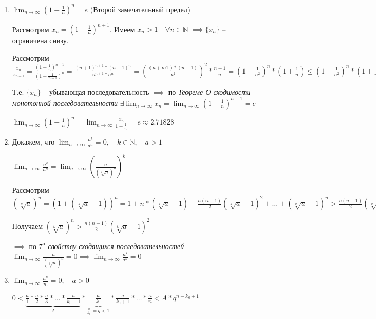 \documentclass[a4paper,oneside]{article}
\newcommand{\dslim}{\displaystyle\lim}
\newcommand{\dslimn}{\dslim_{n \to \infty}}
\begin{document}
\begin{enumerate}
    \item $\displaystyle \lim_{n \to \infty} \left( 1 + \frac{1}{n} \right)^n = e$ (Второй замечательный предел)
    
    Рассмотрим $x_n = \left( 1 + \frac{1}{n} \right)^{n + 1}$. 
    Имеем $x_n > 1 \quad \forall n \in \mathbb{N}$ $\implies \{x_n\}$ -- ограничена снизу.

    Рассмотрим $\frac{x_n}{x_{n-1}} = 
    \frac{\left( 1 + \frac{1}{n} \right)^{n - 1}}{\left( 1 + \frac{1}{n - 1} \right)^{n}}
    = \frac{(n + 1)^{n+1} * (n - 1)^n}{n^{n+1} * n^n}
    = \left( \frac{(n + m1) * (n - 1)}{n^2} \right)^2 * \frac{n + 1}{n}
    = \left( 1 - \frac{1}{n^2} \right)^{n} * \left( 1 + \frac{1}{n} \right)
    \le \left( 1 - \frac{1}{n^2} \right)^{n} * \left( 1 + \frac{1}{n^2} \right)^n
    \le \left( 1 - \frac{1}{n^4} \right)^{n} < 1 \implies x_n < x_{n-1}$

    Т.е. $\{x_n\}$ -- убывающая последовательность $\implies$
    по \textit{Теореме О сходимости монотонной последовательности}
    $\exists \dslimn x_n = 
    \dslimn \left( 1 + \frac{1}{n} \right)^{n + 1} = e$

    $\dslimn \left( 1 - \frac{1}{n} \right)^{n}
    = \dslimn \frac{x_n}{1 + \frac{1}{n}} = e \approx 2.71828$


    \item Докажем, что $\dslimn \frac{n^k}{a^n} = 0,
    \quad k \in \mathbb{N}, \quad a > 1$

    $\dslimn \frac{n^k}{a^n} = 
    \dslimn \left( \frac{n}{(\sqrt[k]{a})^n} \right)^k$

    Рассмотрим $(\sqrt[k]{a})^n = (1 + (\sqrt[k]{a} - 1)) ^ n = 
    1 + n * (\sqrt[k]{a} - 1) + \frac{n (n - 1)}{2} (\sqrt[k]{a} - 1)^2
    + \dots + (\sqrt[k]{a} - 1)^n > \frac{n (n - 1)}{2} (\sqrt[k]{a} - 1)^2$

    Получаем $(\sqrt[k]{a})^n > \frac{n (n - 1)}{2} (\sqrt[k]{a} - 1)^2$

    $\implies$ по \textit{$7^{\text{о}}$ свойству сходящихся последовательностей}
    $\dslimn \frac{n}{(\sqrt[k]{a})^n} = 0
    \implies \dslimn \frac{n^k}{a^n} = 0$


    \item $\dslimn \frac{a^n}{n!} = 0, \quad a > 0$

    $0 < \underbrace{\frac{a}{1} * \frac{a}{2} * \frac{a}{3} * \dots * \frac{a}{k_0 - 1}}_A
    * \underbrace{\frac{a}{k_0}}_{\frac{a}{k_0} = q < 1}
    * \frac{a}{k_0 + 1} * \dots *
    \frac{a}{n} < A * q^{n - k_0 + 1}$


\end{enumerate}
\end{document}
